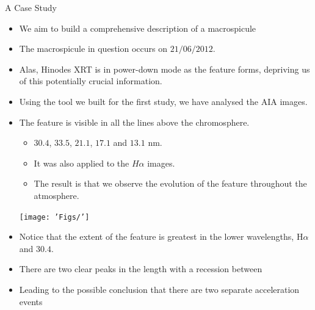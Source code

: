 \documentclass{beamer}
\begin{document}
	
	

	\begin{frame}{A Case Study}
		\begin{itemize}
			\item{We aim to build a comprehensive description of a macrospicule}
			\item{The macrospicule in question occurs on $21/06/2012$.}			
			\item{Alas, Hinodes XRT is in power-down mode as the feature forms, depriving us of this potentially crucial information.}
		\end{itemize}
	\end{frame}	
	
	\begin{frame}
		\begin{itemize}
			\item{Using the tool we built for the first study, we have analysed the AIA images.}
			\item{The feature is visible in all the lines above the chromosphere.}
			\begin{itemize}
				\item{$30.4$, $33.5$, $21.1$, $17.1$ and $13.1$ nm.}
				\item{It was also applied to the $H\alpha$ images.}
				\item{The result is that we observe the evolution of the feature throughout the atmosphere.}
			\end{itemize}
			\texttt{[image: 'Figs/']}
		\end{itemize}
	\end{frame}
	
	\begin{frame}
		\begin{itemize}
			\item{Notice that the extent of the feature is greatest in the lower wavelengths, H$\alpha$ and $30.4$.}
		\end{itemize}
			\begin{itemize}
				\item{There are two clear peaks in the length with a recession between}
				\item{Leading to the possible conclusion that there are two separate acceleration events}
			\end{itemize}
	\end{frame}
	
\end{document}
